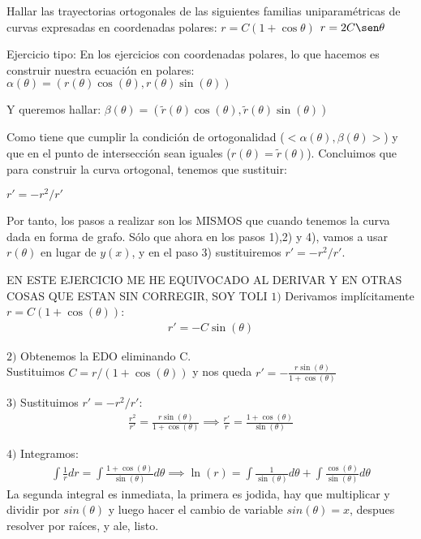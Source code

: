 \documentclass[nochap]{apuntes}
\begin{document}
\begin{problem}[11]
Hallar las trayectorias ortogonales de las siguientes familias uniparamétricas de curvas expresadas en coordenadas polares:
\ppart
$r=C(1+\cos \theta)$
\ppart
$r=2C\sen \theta$

\solution

\begin{expla}
Ejercicio tipo: En los ejercicios con coordenadas polares, lo que hacemos es construir nuestra ecuación en polares:
$\alpha(\theta)=(r(\theta)\cos(\theta),r(\theta)\sin(\theta))$

Y queremos hallar:
$\beta(\theta)=(\tilde{r}(\theta)\cos(\theta),\tilde{r}(\theta)\sin(\theta))$

Como tiene que cumplir la condición de ortogonalidad ($<\alpha(\theta), \beta(\theta)>$) y que en el punto de intersección sean iguales ($r(\theta)=\tilde{r}(\theta)$). Concluimos que para construir la curva ortogonal, tenemos que sustituir:

$r' = -r^2/r'$

Por tanto, los pasos a realizar son los MISMOS que cuando tenemos la curva dada en forma de grafo. Sólo que ahora en los pasos 1),2) y 4), vamos a usar $r(\theta)$ en lugar de $y(x)$, y en el paso 3) sustituiremos $r'=-r^2/r'$. 

\end{expla}

\spart
EN ESTE EJERCICIO ME HE EQUIVOCADO AL DERIVAR Y EN OTRAS COSAS QUE ESTAN SIN CORREGIR, SOY TOLI
$1)$ Derivamos implícitamente $r=C(1+\cos(\theta))$:
\begin{gather*}
r'=-C\sin(\theta)
\end{gather*}

$2)$ Obtenemos la EDO eliminando C.\\
Sustituimos $C=r/(1+\cos(\theta))$ y nos queda $r'=-\frac{r\sin(\theta)}{1+\cos(\theta)}$

$3)$ Sustituimos  $r'=-r^2/r'$:
\begin{gather*}
\frac{r^2}{r'}=\frac{r\sin(\theta)}{1+\cos(\theta)} \implies \frac{r'}{r}=\frac{1+\cos(\theta)}{\sin(\theta)}
\end{gather*}

$4)$ Integramos:
\begin{gather*}
\int \frac{1}{r}dr=\int\frac{1+\cos(\theta)}{\sin(\theta)}d\theta \implies \ln(r)= \int\frac{1}{\sin(\theta)}d\theta+\int\frac{\cos(\theta)}{\sin(\theta)}d\theta
\end{gather*}
La segunda integral es inmediata, la primera es jodida, hay que multiplicar y dividir por $sin(\theta)$ y luego hacer el cambio de variable $sin(\theta)=x$, despues resolver por raíces, y ale, listo.


\end{problem}
\end{document}
